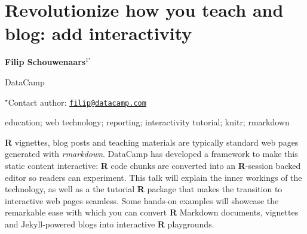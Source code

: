 \documentclass[\main/boa.tex]{subfiles}
\begin{document}
\section{Revolutionize how you teach and blog: add interactivity}

\begin{center}
  {\bf Filip Schouwenaars$^{1^\star}$}
\end{center}

\vskip 0.3cm

\begin{affiliations}
\begin{enumerate}
\begin{minipage}{0.915\textwidth}
\centering
\item DataCamp \\[-2pt]
\end{minipage}
\end{enumerate}
$^\star$Contact author: \href{mailto:filip@datacamp.com}{\nolinkurl{filip@datacamp.com}}\\
\end{affiliations}

\vskip 0.5cm

\begin{minipage}{0.915\textwidth}
\keywords education; web technology; reporting; interactivity
\packages tutorial; knitr; rmarkdown
\end{minipage}

\vskip 0.8cm

\textbf{R} vignettes, blog posts and teaching materials are typically
standard web pages generated with \emph{rmarkdown}. DataCamp has
developed a framework to make this static content interactive:
\textbf{R} code chunks are converted into an \textbf{R}-session backed
editor so readers can experiment. This talk will explain the inner
workings of the technology, as well as a the tutorial \textbf{R} package
that makes the transition to interactive web pages seamless. Some
hands-on examples will showcase the remarkable ease with which you can
convert \textbf{R} Markdown documents, vignettes and Jekyll-powered
blogs into interactive \textbf{R} playgrounds.
\end{document}
